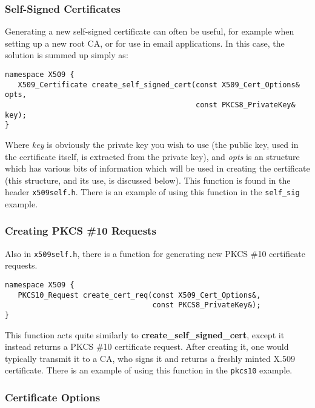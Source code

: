 \documentclass{article}
\newcommand{\filename}[1]{\texttt{#1}}
\newcommand{\function}[1]{\textbf{#1}}
\renewcommand{\arg}[1]{\textsl{#1}}
\begin{document}
\pagebreak

\subsubsection{Self-Signed Certificates}

Generating a new self-signed certificate can often be useful, for example when
setting up a new root CA, or for use in email applications. In this case,
the solution is summed up simply as:

\begin{verbatim}
namespace X509 {
   X509_Certificate create_self_signed_cert(const X509_Cert_Options& opts,
                                            const PKCS8_PrivateKey& key);
}
\end{verbatim}

Where \arg{key} is obviously the private key you wish to use (the public key,
used in the certificate itself, is extracted from the private key), and
\arg{opts} is an structure which has various bits of information which will be
used in creating the certificate (this structure, and its use, is discussed
below). This function is found in the header \filename{x509self.h}. There is an
example of using this function in the \filename{self\_sig} example.

\subsubsection{Creating PKCS \#10 Requests}

Also in \filename{x509self.h}, there is a function for generating new PKCS \#10
certificate requests.

\begin{verbatim}
namespace X509 {
   PKCS10_Request create_cert_req(const X509_Cert_Options&,
                                  const PKCS8_PrivateKey&);
}
\end{verbatim}

This function acts quite similarly to \function{create\_self\_signed\_cert},
except it instead returns a PKCS \#10 certificate request. After creating it,
one would typically transmit it to a CA, who signs it and returns a freshly
minted X.509 certificate. There is an example of using this function in the
\filename{pkcs10} example.

\subsubsection{Certificate Options}
\end{document}

